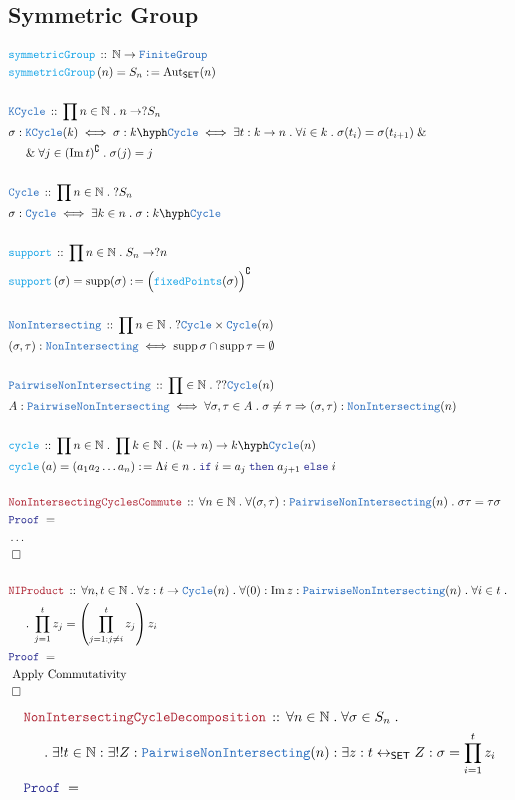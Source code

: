 \documentclass[12pt]{scrartcl}
\newcommand{\TYPE}[1]{\textcolor{NavyBlue}{\mathtt{#1}}}
\newcommand{\FUNC}[1]{\textcolor{Cerulean}{\mathtt{#1}}}
\newcommand{\LOGIC}[1]{\textcolor{Blue}{\mathtt{#1}}}
\newcommand{\THM}[1]{\textcolor{Maroon}{\mathtt{#1}}}
\renewcommand{\.}{\; . \;}
\newcommand{\de}{: \kern 0.1pc =}
\newcommand{\If}{\LOGIC{if} \;}
\newcommand{\Then}{ \; \LOGIC{then} \;}
\newcommand{\Else}{\; \LOGIC{else} \;}
\newcommand{\Act}[1]{\left( #1 \right)}
\newcommand{\Theorem}[2]{& \THM{#1} \, :: \, #2 \\ & \Proof = \\ }
\newcommand{\DeclareType}[2]{& \TYPE{#1} \, :: \, #2 \\}
\newcommand{\DefineType}[3]{& #1 : \TYPE{#2} \iff #3 \\}
\newcommand{\DeclareFunc}[2]{& \FUNC{#1} \, :: \, #2 \\}
\newcommand{\DefineNamedFunc}[4]{&  \FUNC{#1}\Act{#2} = #3 \de #4 \\}
\newcommand{\NewLine}{\\ & \kern 1pc}
\newcommand{\Page}[1]{ \begin{align*} #1 \end{align*}   }
\newcommand{\NoProof}{ & \ldots \\ \EndProof}
\renewcommand{\And}{\; \& \;}
\newcommand{\Nat}{\mathbb{N} }
\DeclareMathOperator*{\im}{Im}
\DeclareMathOperator*{\supp}{supp}
\newcommand{\Aut}{\mathrm{Aut}}
\newcommand{\ToBij}{\leftrightarrow}
\renewcommand{\c}{\complement}
\newcommand{\QED}{\; \square}
\newcommand{\EndProof}{& \QED \\}
\newcommand{\Proof}{\LOGIC{Proof} \; }
\newcommand{\SET}{\mathsf{SET}}
\newcommand{\FG}{\TYPE{FiniteGroup}}
\begin{document}
\subsection{Symmetric Group}
\Page{
	\DeclareFunc{symmetricGroup}{\Nat \to \FG}
	\DefineNamedFunc{symmetricGroup}{ n   }{S_n}{\Aut_{\SET}(n)}
	\\
	\DeclareType{KCycle}{\prod n \in \Nat \. n \to ?S_n}
	& \sigma :   \TYPE{KCycle}(k) \iff
	 \sigma : k \hyph \TYPE{Cycle} \iff \exists t : k \to n \. \forall i \in k \. \sigma(t_i) = \sigma(t_{i+1}) 
		\And \NewLine \And \forall j \in (\im t)^\c \. \sigma(j) = j  \\
	\\
	\DeclareType{Cycle}{\prod n \in \Nat \. ?S_n}
	\DefineType{\sigma}{Cycle}{\exists k \in n \. \sigma : k \hyph \TYPE{Cycle}}
	\\
	\DeclareFunc{support}{\prod n \in \Nat \. S_n \to ?n}
	\DefineNamedFunc{support}{ \sigma }{ \supp(\sigma)   }{ \Big( \FUNC{fixedPoints}(\sigma) \Big)^\c }
	\\
	\DeclareType{NonIntersecting}{\prod n \in \Nat \. ? \TYPE{Cycle} \times \TYPE{Cycle}(n)}
	\DefineType{(\sigma,\tau)}{NonIntersecting}{ \supp \sigma \cap \supp \tau = \emptyset }
	\\
	\DeclareType{PairwiseNonIntersecting}{\prod  \in \Nat \. ??\TYPE{Cycle}(n) }
	\DefineType{A}{PairwiseNonIntersecting}{\forall \sigma,\tau \in A \. \sigma \neq \tau  \Rightarrow 
		(\sigma, \tau) : \TYPE{NonIntersecting}(n)}
	\\
	\DeclareFunc{cycle}{\prod n \in \Nat \. \prod k \in \Nat \.  (k \to n) \to k\hyph\TYPE{Cycle}(n)}
	\DefineNamedFunc{cycle}{a}{(a_1 a_2 \ldots a_n)}{ \Lambda i \in n \. \If i = a_j 
		\Then a_{j+1} \Else i }
	\\
	\Theorem{NonIntersectingCyclesCommute}{\forall n \in \Nat \. \forall 
		(\sigma,\tau) : \TYPE{PairwiseNonIntersecting}(n) \. 
		\sigma\tau = \tau \sigma 
		}
		\NoProof
	\\
	\Theorem{NIProduct}{ \forall n,t \in \Nat \. \forall z  : t \to \TYPE{Cycle}(n) \. 
		\forall (0) : \im z : \TYPE{PairwiseNonIntersecting}(n) \. \forall i \in t \. 
		\NewLine
		\. \prod^t_{j=1} z_j = \left(\prod^t_{j=1 : j \neq i} z_j \right)z_i  
	}
	& \text{ Apply Commutativity  } \\
	\EndProof
}\Page{
	\Theorem{NonIntersectingCycleDecomposition}{ \forall n \in \Nat \. \forall \sigma \in S_n \. 
		\NewLine \. \exists ! t \in \Nat : \exists ! Z : \TYPE{PairwiseNonIntersecting}(n)
		: \exists z : t \ToBij_{\SET} Z : \sigma = \prod^t_{i=1} z_i 
}}
\end{document}

